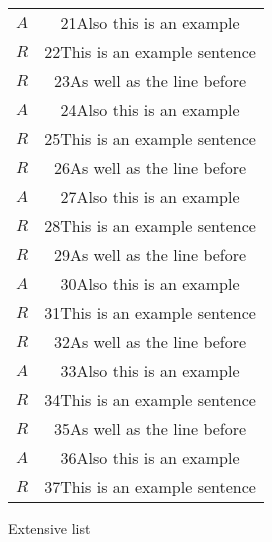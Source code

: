 \begin{longtable}{cc}
	$A$ & 21Also this is an example \\[6pt]
	$R$ & 22This is an example sentence \\[6pt]
	$R$ & 23As well as the line before \\[6pt]
	$A$ & 24Also this is an example \\[6pt]
	$R$ & 25This is an example sentence \\[6pt]
	$R$ & 26As well as the line before \\[6pt]
	$A$ & 27Also this is an example \\[6pt]
	$R$ & 28This is an example sentence \\[6pt]
	$R$ & 29As well as the line before \\[6pt]
	$A$ & 30Also this is an example \\[6pt]
	$R$ & 31This is an example sentence \\[6pt]
	$R$ & 32As well as the line before \\[6pt]
	$A$ & 33Also this is an example \\[6pt]
	$R$ & 34This is an example sentence \\[6pt]
	$R$ & 35As well as the line before \\[6pt]
	$A$ & 36Also this is an example \\[6pt]
	$R$ & 37This is an example sentence \\[6pt]
\end{longtable} 

\begin{table}[H]	
\begin{center}
\caption{Extensive list}
\small{
}
\end{center}
\end{table}


